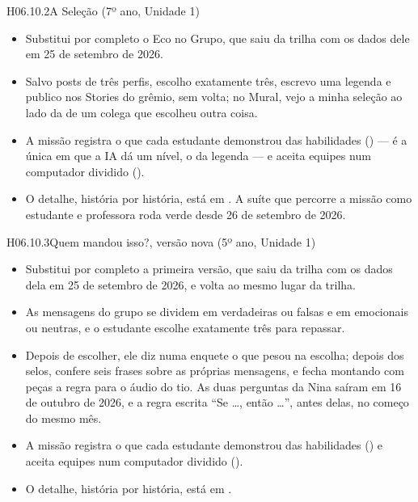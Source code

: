 \begin{historia}{H06.10.2}{A Seleção (7º ano, Unidade 1)}{\parcial}
\aceite
\begin{itemize}
  \item Substitui por completo o Eco no Grupo, que saiu da trilha com os dados
    dele em 25 de setembro de 2026.
  \item Salvo posts de três perfis, escolho exatamente três, escrevo uma
    legenda e publico nos Stories do grêmio, sem volta; no Mural, vejo a minha
    seleção ao lado da de um colega que escolheu outra coisa.
  \item A missão registra o que cada estudante demonstrou das habilidades
    () --- é a única em que a IA dá um nível, o da legenda --- e aceita
    equipes num computador dividido ().
  \item O detalhe, história por história, está em . A suíte que
    percorre a missão como estudante e professora roda verde desde 26 de
    setembro de 2026.
\end{itemize}
\end{historia}

\begin{historia}{H06.10.3}{Quem mandou isso?, versão nova (5º ano, Unidade 1)}{\parcial}
\aceite
\begin{itemize}
  \item Substitui por completo a primeira versão, que saiu da trilha com os
    dados dela em 25 de setembro de 2026, e volta ao mesmo lugar da trilha.
  \item As mensagens do grupo se dividem em verdadeiras ou falsas e em
    emocionais ou neutras, e o estudante escolhe exatamente três para repassar.
  \item Depois de escolher, ele diz numa enquete o que pesou na escolha;
    depois dos selos, confere seis frases sobre as próprias mensagens, e fecha
    montando com peças a regra para o áudio do tio. As duas perguntas da Nina
    saíram em 16 de outubro de 2026, e a regra escrita \enquote{Se \ldots,
    então \ldots}, antes delas, no começo do mesmo mês.
  \item A missão registra o que cada estudante demonstrou das habilidades
    () e aceita equipes num computador dividido ().
  \item O detalhe, história por história, está em .
\end{itemize}
\end{historia}


